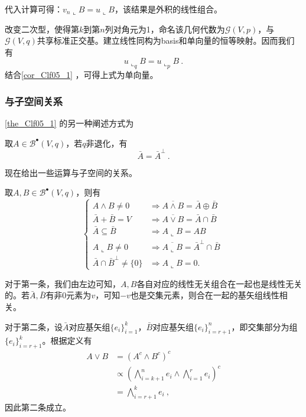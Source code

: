 代入计算可得：$v_n\llcorner B=u\llcorner B$，该结果是外积的线性组合。

改变二次型，使得第$k$到第$n$列对角元为1，命名该几何代数为$\mathcal G(V,p)$，与$\mathcal G(V,q)$共享标准正交基。建立线性同构为basis和单向量的恒等映射。因而我们有
\begin{equation}\label{eq_Clf05_1}
u\llcorner_q B=u\llcorner _p B~.
\end{equation}
结合\autoref{cor_Clf05_1} ，可得上式为单向量。


\subsubsection{与子空间关系}
\autoref{the_Clf05_1} 的另一种阐述方式为
\begin{theorem}{}
取$A\in \mathcal B^{\bullet}(V,q)$，若$q$非退化，有
\begin{equation}
\bar A=\bar A^{\perp}~.
\end{equation}
\end{theorem}
现在给出一些运算与子空间的关系。
\begin{theorem}{}
取$A,B\in \mathcal B^{\bullet}(V,q)$，则有
\begin{equation}
\left\{\begin{aligned}
A \wedge B \neq 0 & \Longrightarrow \overline{A \wedge B}=\bar{A} \oplus \bar{B} \\
\bar{A}+\bar{B}=V & \Longrightarrow \overline{A \vee B}=\bar{A} \cap \bar{B} \\
\bar{A} \subseteq \bar{B} & \Longrightarrow A\llcorner B=A B \\
A\llcorner B \neq 0 & \Longrightarrow \overline{A\llcorner B}=\bar{A}^{\perp} \cap \bar{B} \\
\bar{A} \cap \bar{B}^{\perp} \neq\{0\} & \Longrightarrow A\llcorner B=0 .
\end{aligned}\right.~
\end{equation}
\end{theorem}
对于第一条，我们由左边可知，$A,B$各自对应的线性无关组合在一起也是线性无关的。若$\bar A,\bar B$有非0元素为$v$，可知$-v$也是交集元素，则合在一起的基矢组线性相关。

对于第二条，设$\bar A$对应基矢组$\{e_i\}^k_{i=1}$，$\bar B$对应基矢组$\{e_i\}^n_{i=r+1}$，即交集部分为组$\{e_i\}^k_{i=r+1}$。根据定义有
\begin{equation}
\begin{aligned}
A \vee B &=(A^c\wedge B^c)^c\\
&\propto\left(\bigwedge\limits^n_{i=k+1}e_i\wedge \bigwedge\limits^r_{i=1}e_i\right)^c\\
&=\bigwedge\limits^k_{i=r+1}e_i~,
\end{aligned}
\end{equation}
因此第二条成立。

